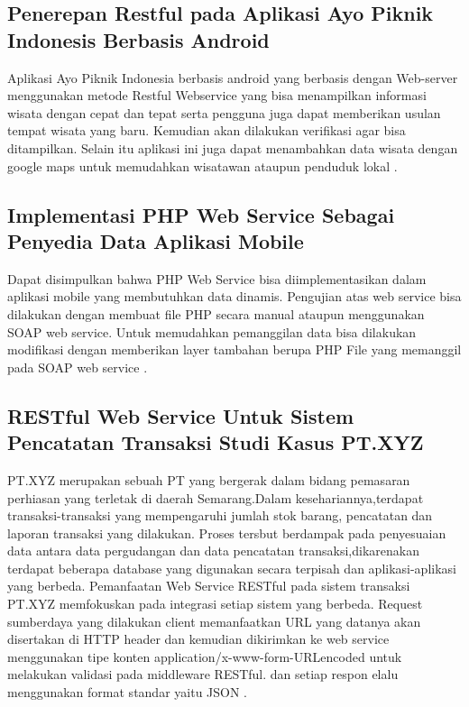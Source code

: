 \subsection{Penerepan Restful pada Aplikasi Ayo Piknik Indonesis Berbasis Android}
Aplikasi Ayo Piknik Indonesia berbasis android yang berbasis dengan Web-server menggunakan metode Restful Webservice yang bisa menampilkan informasi wisata dengan cepat dan tepat serta pengguna juga dapat memberikan usulan tempat wisata yang baru. Kemudian akan dilakukan verifikasi agar bisa ditampilkan. Selain itu aplikasi ini juga  dapat menambahkan data wisata dengan google maps untuk memudahkan wisatawan ataupun penduduk lokal \cite{aji2016penerapan}.

\subsection{Implementasi PHP Web Service Sebagai Penyedia Data Aplikasi Mobile}
Dapat disimpulkan bahwa PHP Web Service bisa diimplementasikan dalam aplikasi mobile yang membutuhkan data dinamis. Pengujian atas web service bisa dilakukan dengan membuat file PHP secara manual ataupun menggunakan SOAP web service. Untuk memudahkan pemanggilan data bisa dilakukan modifikasi dengan memberikan layer tambahan berupa PHP File yang memanggil pada SOAP web service \cite{surendra2014implementasi}.

\subsection{RESTful Web Service Untuk Sistem Pencatatan Transaksi Studi Kasus PT.XYZ}
PT.XYZ merupakan sebuah PT yang bergerak dalam bidang pemasaran perhiasan yang terletak di daerah Semarang.Dalam kesehariannya,terdapat transaksi-transaksi yang mempengaruhi jumlah stok barang, pencatatan dan laporan transaksi yang dilakukan. Proses tersbut berdampak pada penyesuaian data antara data pergudangan dan data pencatatan transaksi,dikarenakan terdapat beberapa database yang digunakan secara terpisah dan aplikasi-aplikasi yang berbeda.
Pemanfaatan Web Service RESTful pada sistem transaksi PT.XYZ memfokuskan pada integrasi setiap sistem yang berbeda. Request sumberdaya yang dilakukan client memanfaatkan URL yang datanya akan disertakan di HTTP header dan kemudian dikirimkan ke web service menggunakan tipe konten application/x-www-form-URLencoded untuk melakukan validasi pada middleware RESTful. dan setiap respon elalu menggunakan format standar yaitu JSON \cite{tanaem2016restful}.

